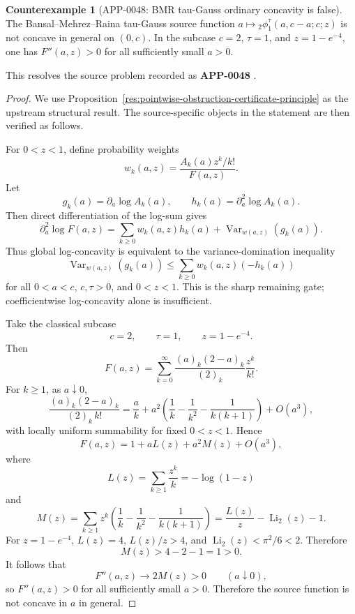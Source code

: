 \documentclass[11pt]{article}
\numberwithin{equation}{section}
\theoremstyle{definition}
\newtheorem{counterexample}[theorem]{Counterexample}
\theoremstyle{remark}
\newcommand{\1}{\mathbf 1}
\begin{document}
\begin{counterexample}[APP-0048: BMR tau-Gauss ordinary concavity is false]
\label{res:bmr-tau-gauss-not-globally-concave}
The Bansal--Mehrez--Raina tau-Gauss source function \(a\mapsto {}_2\phi^\tau_1(a,c-a;c;z)\) is not concave in general on \((0,c)\). In the subcase \(c=2\), \(\tau=1\), and \(z=1-e^{-4}\), one has \(F''(a,z)>0\) for all sufficiently small \(a>0\).



This resolves the source problem recorded as \textbf{APP-0048} \cite{app-app-0048-source}.
\end{counterexample}

\begin{proof}
We use Proposition~\ref{res:pointwise-obstruction-certificate-principle} as the upstream structural result. The source-specific objects in the statement are then verified as follows.

For \(0<z<1\), define probability weights
\[
w_k(a,z)=\frac{A_k(a)z^k/k!}{F(a,z)}.
\]
Let
\[
g_k(a)=\partial_a\log A_k(a),
\qquad
h_k(a)=\partial_a^2\log A_k(a).
\]
Then direct differentiation of the log-sum gives
\[
\partial_a^2\log F(a,z)
=
\sum_{k\ge0}w_k(a,z)h_k(a)
+\operatorname{Var}_{w(a,z)}(g_k(a)).
\]
Thus global log-concavity is equivalent to the variance-domination inequality
\[
\operatorname{Var}_{w(a,z)}(g_k(a))
\le
\sum_{k\ge0}w_k(a,z)(-h_k(a))
\]
for all \(0<a<c\), \(c,\tau>0\), and \(0<z<1\). This is the sharp remaining gate; coefficientwise log-concavity alone is insufficient.

Take the classical subcase
\[
c=2,\qquad \tau=1,\qquad z=1-e^{-4}.
\]
Then
\[
F(a,z)=
\sum_{k=0}^{\infty}
\frac{(a)_k(2-a)_k}{(2)_k}\frac{z^k}{k!}.
\]
For \(k\ge1\), as \(a\downarrow0\),
\[
\frac{(a)_k(2-a)_k}{(2)_k\,k!}
=
\frac{a}{k}
+a^2\left(
\frac1k-\frac1{k^2}-\frac1{k(k+1)}
\right)+O(a^3),
\]
with locally uniform summability for fixed \(0<z<1\). Hence
\[
F(a,z)=1+aL(z)+a^2M(z)+O(a^3),
\]
where
\[
L(z)=\sum_{k\ge1}\frac{z^k}{k}=-\log(1-z)
\]
and
\[
M(z)=
\sum_{k\ge1}z^k
\left(
\frac1k-\frac1{k^2}-\frac1{k(k+1)}
\right)
=
\frac{L(z)}{z}-\operatorname{Li}_2(z)-1.
\]
For \(z=1-e^{-4}\), \(L(z)=4\), \(L(z)/z>4\), and \(\operatorname{Li}_2(z)<\pi^2/6<2\). Therefore
\[
M(z)>4-2-1=1>0.
\]
It follows that
\[
F''(a,z)\to2M(z)>0
\qquad(a\downarrow0),
\]
so \(F''(a,z)>0\) for all sufficiently small \(a>0\). Therefore the source function is not concave in \(a\) in general.
\end{proof}
\end{document}
